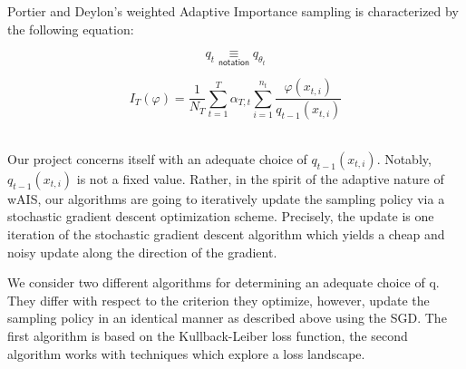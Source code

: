 
Portier and Deylon's weighted Adaptive Importance sampling is characterized by the following equation:


$$q_t \underset {\textsf{notation}} \equiv q_{\theta_t}$$

$$\boxed{
I_T(\varphi) = \frac 1 {N_T} \displaystyle\sum\limits_{t=1}^T \alpha_{T,t} \displaystyle\sum\limits_{i = 1}^{n_t} \frac {\varphi(x_{t,i})}{q_{t-1}(x_{t,i})}
}$$ ~\cite{portierdelyonWAIS}

Our project concerns itself with an adequate choice of $q_{t-1}(x_{t, i})$. Notably, $q_{t-1}(x_{t, i})$ is not a fixed value. Rather, in the spirit of the adaptive nature of wAIS, our algorithms are going to iteratively update the sampling policy via a stochastic gradient descent optimization scheme. Precisely, the update is one iteration of the stochastic gradient descent algorithm which yields a cheap and noisy update along the direction of the gradient. 

We consider two different algorithms for determining an adequate choice of q. They differ with respect to the criterion they optimize, however, update the sampling policy in an identical manner as described above using the SGD. 
The first algorithm is based on the Kullback-Leiber loss function, the second algorithm works with techniques which explore a loss landscape. 
